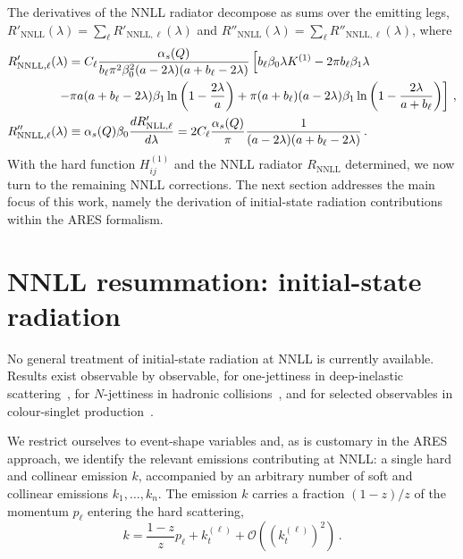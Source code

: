 The derivatives of the NNLL radiator decompose as sums over the
emitting legs, $R'_{\mathrm{NNLL}}(\lambda)=\sum_\ell R'_{\mathrm{NNLL},\ell}(\lambda)$
and $R''_{\mathrm{NNLL}}(\lambda)=\sum_\ell R''_{\mathrm{NNLL},\ell}(\lambda)$, where
\begin{subequations}
\begin{align}
 \label{eq:RNNLL}
	&R'_{\mathrm{NNLL},\ell}(\lambda)=C_{\ell}\frac{\alpha_s(Q)}{b_{\ell}\pi^2\beta_0^2(a-2\lambda)(a+b_{\ell}-2\lambda)}
		\left[b_{\ell}\beta_0\lambda K^{(1)}-2\pi b_{\ell}\beta_1\lambda \right. \notag\\ 
		& \qquad\qquad \left.-\pi a(a+b_{\ell}-2\lambda)\beta_1\ln\left(1-\frac{2\lambda}{a}\right)+\pi(a+b_{\ell})(a-2\lambda)\beta_1\ln\left(1-\frac{2\lambda}{a+b_{\ell}}\right)\right]\,,
	 \\ \label{eq:R2NNLL}
	&R''_{\mathrm{NNLL},\ell}(\lambda)\equiv \alpha_s(Q)\beta_0\frac{dR'_{\mathrm{NLL},\ell}}{d\lambda}=2C_{\ell}\frac{\alpha_s(Q)}{\pi}\frac{1}{(a-2\lambda)(a+b_{\ell}-2\lambda)}\,.
	\end{align}
\end{subequations}
With the hard function $H^{(1)}_{ij}$ and the NNLL radiator
$R_{\mathrm{NNLL}}$ determined, we now turn to the remaining NNLL
corrections. The next section addresses the main focus of this work,
namely the derivation of initial-state radiation contributions within
the \textsc{ARES} formalism.

\section{NNLL resummation: initial-state radiation}
\label{sec:NNLL-initial}

No general treatment of initial-state radiation at NNLL is currently
available. Results exist observable by observable, for one-jettiness in
deep-inelastic scattering~\cite{Kang:2013ata, Kang:2013lga}, for
$N$-jettiness in hadronic collisions~\cite{Stewart:2010tn,
  Gaunt:2015pea}, and for selected observables in colour-singlet
production~\cite{vanBeekveld:2025zjh}.

We restrict ourselves to event-shape variables and, as is customary in
the \textsc{ARES} approach, we identify the relevant emissions contributing 
at NNLL: a single hard and collinear emission $k$, accompanied by an arbitrary number of soft and collinear emissions $k_1,\dots,k_n$. 
The emission $k$ carries a fraction $(1-z)/z$ of the momentum $p_\ell$ entering the hard scattering, 
\begin{equation}
  \label{eq:k||l}
  k = \frac{1-z}{z} p_\ell + k_t^{(\ell)}+ \mathcal{O}\left(\left(k_t^{(\ell)}\right)^2\right)\,.
\end{equation}

